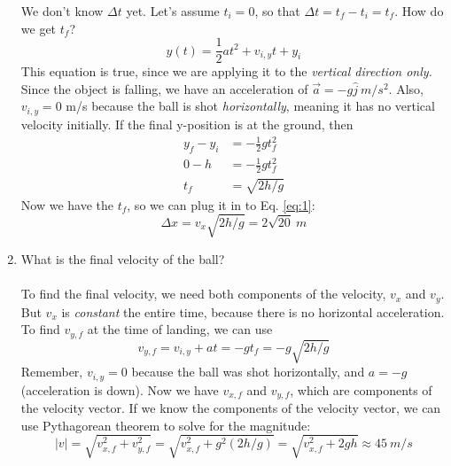 \documentclass[10pt]{article}
\begin{document}
\begin{enumerate}
We don't know $\Delta t$ yet.  Let's assume $t_i = 0$, so that $\Delta t = t_f - t_i = t_f$.  How do we get $t_f$?
\begin{equation}
y(t) = \frac{1}{2}at^2 + v_{i,y} t + y_{i}
\end{equation}
This equation is true, since we are applying it to the \textit{vertical direction only.}  Since the object is falling, we have an acceleration of $\vec{a} = -g \hat{j} ~ m/s^2$.  Also, $v_{i,y} = 0$ m/s because the ball is shot \textit{horizontally}, meaning it has no vertical velocity initially.  If the final y-position is at the ground, then 
\begin{align}
y_f - y_i &= -\frac{1}{2}gt_f^2 \\
0-h &= -\frac{1}{2}gt_f^2 \\
t_f &= \sqrt{2h/g}
\end{align}
Now we have the $t_f$, so we can plug it in to  Eq. \ref{eq:1}:
\begin{equation}
\Delta x = v_x \sqrt{2h/g} = 2\sqrt{20} ~ m
\end{equation}
\item What is the final velocity of the ball? \\ \\
To find the final velocity, we need both components of the velocity, $v_x$ and $v_y$.  But $v_x$ is \textit{constant} the entire time, because there is no horizontal acceleration.  To find $v_{y,f}$ at the time of landing, we can use
\begin{equation}
v_{y,f} = v_{i,y} + a t = -gt_f = -g \sqrt{2h/g}
\end{equation}
Remember, $v_{i,y} = 0$ because the ball was shot horizontally, and $a = -g$ (acceleration is down).  Now we have $v_{x,f}$ and $v_{y,f}$, which are components of the velocity vector.  If we know the components of the velocity vector, we can use Pythagorean theorem to solve for the magnitude:
\begin{equation}
|v| = \sqrt{v_{x,f}^2 + v_{y,f}^2} = \sqrt{v_{x,f}^2 + g^2 (2h/g)} = \sqrt{v_{x,f}^2 + 2gh} \approx 45 ~ m/s
\end{equation}
\end{enumerate}
\end{document}

